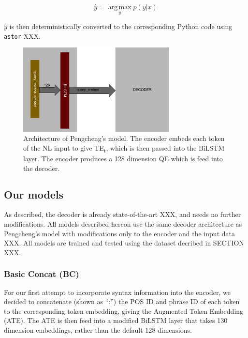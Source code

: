 \documentclass{IEEEtran}
\begin{document}
      \begin{equation}
        \label{eq:pengcheng}
        \hat{y} = \operatorname*{arg\,max}_y p(y\vert x)
      \end{equation}

      $ \hat{y} $ is then deterministically converted to the corresponding Python code using
      \texttt{astor} XXX.

      \begin{figure}[h]
        \centering
        \includegraphics[width=8cm]{pengcheng.png}
        \caption{Architecture of Pengcheng's model. The encoder embeds each token of the NL input
        to give TE\textsubscript{t}, which is then passed into the BiLSTM layer. The encoder
        produces a 128 dimension QE which is feed into the decoder.}
        \label{fig:pengcheng}
      \end{figure}

      \subsection{Our models}
      As described, the decoder is already state-of-the-art XXX, and needs no further 
      modifications. All models described hereon use the same decoder architecture as Pengcheng's 
      model with modifications only to the encoder and the input data XXX. All models are 
      trained and tested using the dataset decribed in SECTION XXX. \\

        \subsubsection{Basic Concat (BC)}
        For our first attempt to incorporate syntax information into the encoder, we decided to 
        concatenate (shown as ``:'') the POS ID and phrase ID of each token to the corresponding 
        token embedding, giving the Augmented Token Embedding (ATE). The ATE is then feed into 
        a modified BiLSTM layer that takes 130 dimension embeddings, rather than the default 128 
        dimensions. \\
\end{document}
